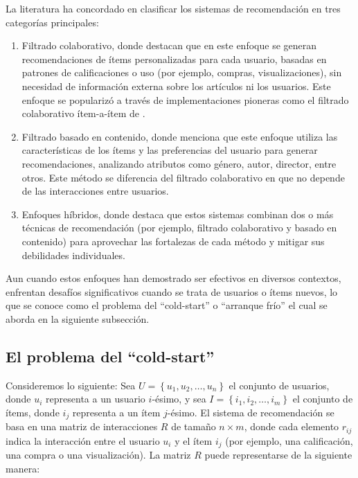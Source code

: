 		La literatura ha concordado en clasificar los sistemas de recomendación en tres categorías principales: 

		\begin{enumerate}
			\item Filtrado colaborativo, donde \cite{Koren2015} destacan que en este enfoque se generan recomendaciones de ítems personalizadas para cada usuario, basadas en patrones de calificaciones o uso (por ejemplo, compras, visualizaciones), sin necesidad de información externa sobre los artículos ni los usuarios. Este enfoque se popularizó a través de implementaciones pioneras como el filtrado colaborativo ítem-a-ítem de \cite{10.1145/371920.372071}.
			\item Filtrado basado en contenido, donde \cite{Aggarwal2016} menciona que este enfoque utiliza las características de los ítems y las preferencias del usuario para generar recomendaciones, analizando atributos como género, autor, director, entre otros. Este método se diferencia del filtrado colaborativo en que no depende de las interacciones entre usuarios.
			\item Enfoques híbridos, donde \cite{burke2002hybrid} destaca que estos sistemas combinan dos o más técnicas de recomendación (por ejemplo, filtrado colaborativo y basado en contenido) para aprovechar las fortalezas de cada método y mitigar sus debilidades individuales.
		\end{enumerate}

		Aun cuando estos enfoques han demostrado ser efectivos en diversos contextos, enfrentan desafíos significativos cuando se trata de usuarios o ítems nuevos, lo que se conoce como el problema del \enquote{cold-start} o \enquote{arranque frío} el cual se aborda en la siguiente subsección.

	\subsection{El problema del \enquote{cold-start}}
		Consideremos lo siguiente: Sea $U = \left\{ u_{1}, u_{2}, \dots, u_{n} \right\}$ el conjunto de usuarios, donde $u_{i}$ representa a un usuario $i$-ésimo, y sea $I = \left\{ i_{1}, i_{2}, \dots, i_{m} \right\}$ el conjunto de ítems, donde $i_{j}$ representa a un ítem $j$-ésimo. El sistema de recomendación se basa en una matriz de interacciones $R$ de tamaño $n \times m$, donde cada elemento $r_{ij}$ indica la interacción entre el usuario $u_{i}$ y el ítem $i_{j}$ (por ejemplo, una calificación, una compra o una visualización). La matriz $R$ puede representarse de la siguiente manera:

